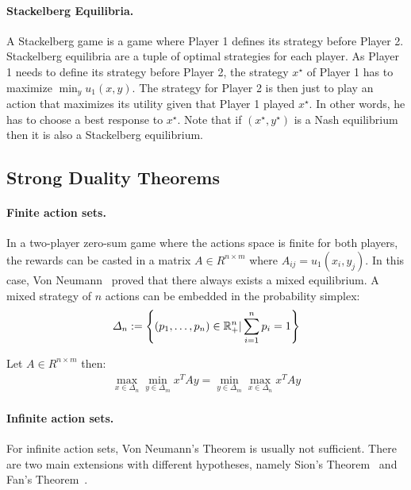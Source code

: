 \paragraph{Stackelberg Equilibria.} A Stackelberg game is a game where Player 1 defines its strategy before Player 2. Stackelberg equilibria are a tuple of optimal strategies for each player. As Player 1 needs to define its strategy before Player 2, the strategy $x^\star$ of Player 1 has to maximize $\min_y u_1(x,y)$. The strategy for Player 2 is then just to play an action that maximizes its utility given that Player 1 played $x^\star$. In other words, he has to choose a best response to $x^\star$. Note that if $(x^\star,y^\star)$ is a Nash equilibrium then it is also a Stackelberg equilibrium.



\subsection{Strong Duality Theorems}

\paragraph{Finite action sets.} In a two-player zero-sum game where the actions space is finite for both players, the rewards can be casted in a matrix $A\in R^{n\times m}$ where $A_{ij} =u_1(x_i,y_j)$. In this case, Von Neumann~\citep{von1937uber} proved that there always exists a mixed equilibrium. A mixed strategy of $n$ actions can be embedded in the probability simplex:
\begin{align*}
    \Delta_n := \left\{(p_1,\dots,p_n)\in\RR_+^n| \sum_{i=1}^n p_i = 1  \right\}
\end{align*}

\begin{thm}
    Let $A\in R^{n\times m}$ then:
    \begin{align*}
        \max_{x\in \Delta_n}\min_{y\in \Delta_m} x^TAy = \min_{y\in \Delta_m}\max_{x\in \Delta_n} x^TAy
    \end{align*}
\end{thm}

\paragraph{Infinite action sets.} For infinite action sets, Von Neumann's Theorem is usually not sufficient. There are two main extensions with different hypotheses, namely Sion's Theorem~\citep{sion1958general} and Fan's Theorem~\citep{fan1953minimax}.

